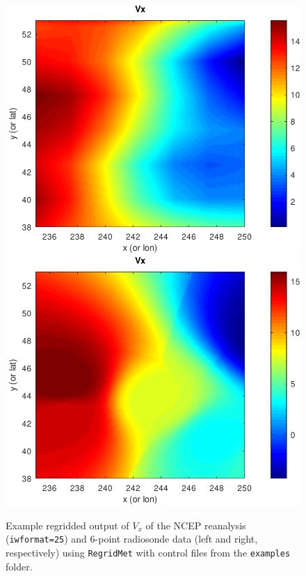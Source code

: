 \documentclass[11pt]{article}   %
\begin{document}
\begin{figure}[htbp]\begin{center}
 \includegraphics[angle=0,scale=0.55]{Figs/RegNCEP.pdf}
 \includegraphics[angle=0,scale=0.55]{Figs/RegSonde.pdf}
 \parbox{15cm}{\caption{\label{FigRegrid}
 Example regridded output of $V_x$ of the NCEP reanalysis (\texttt{iwformat=25}) and
 6-point radiosonde data (left and right, respectively) using \texttt{RegridMet} with control files
 from the \texttt{examples} folder.
 }}
 \end{center}\end{figure}
\end{document}
